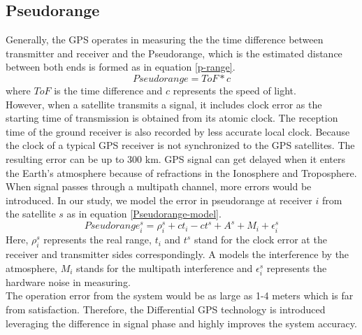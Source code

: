 \documentclass[journal,onecolumn]{IEEEtran}
\begin{document}
\subsection{Pseudorange}
Generally, the GPS operates in measuring the the time difference between transmitter
and receiver and the Pseudorange, which is the estimated distance between both ends
is formed as in equation \ref{p-range}.
\begin{equation}
  Pseudorange = ToF * c
  \label{p-range}
\end{equation}
where $ToF$ is the time difference and $c$ represents the speed of light.\\
However, when a satellite transmits a signal, it includes clock error as the starting time
of transmission is obtained from its atomic clock. The reception time of the
ground receiver is also recorded by less accurate local clock. Because the clock
of a typical GPS receiver is not synchronized to the GPS satellites.
The resulting error can be up to 300 km. GPS signal can get delayed when it enters
the Earth’s atmosphere because of refractions in the Ionosphere and Troposphere.
When signal passes through a multipath channel, more errors would be introduced.
In our study, we model the error in pseudorange at receiver $i$ from the satellite
$s$ as in equation \ref{Pseudorange-model}.
\begin{equation}
  Pseudorange_i^s = \rho_i^s + ct_i - ct^s + A^s + M_i + \epsilon_i^s
  \label{Pseudorange-model}
\end{equation}
Here, $\rho_i^s$ represents the real range, $t_i$ and $t^s$ stand for the clock error at
the receiver and transmitter sides correspondingly. A models the interference by the
atmosphere, $M_i$ stands for the multipath interference and $\epsilon_i^s$ represents
the hardware noise in measuring.\\
The operation error from the system would be as large as 1-4 meters which is far from
satisfaction. Therefore, the Differential GPS technology is introduced leveraging
the difference in signal phase and highly improves the system accuracy.\\
\end{document}

